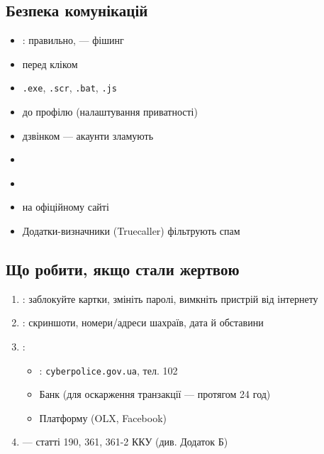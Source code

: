 \subsection*{Безпека комунікацій}

\begin{itemize}[label=--]
\item {}:  правильно,  — фішинг
\item {} перед кліком
\item {} \texttt{.exe}, \texttt{.scr}, \texttt{.bat}, \texttt{.js}
\end{itemize}

\begin{itemize}[label=--]
\item {} до профілю (налаштування приватності)
\item {} дзвінком — акаунти зламують
\item {}
\end{itemize}

\begin{itemize}[label=--]
\item {}
\item {} на офіційному сайті
\item Додатки-визначники (Truecaller) фільтрують спам
\end{itemize}

\subsection*{Що робити, якщо стали жертвою}

\begin{enumerate}[label=\arabic*)]
\item {}: заблокуйте картки, змініть паролі, вимкніть пристрій від інтернету

\item {}: скриншоти, номери/адреси шахраїв, дата й обставини

\item {}:
   \begin{itemize}[label=--]
   \item {}: \texttt{cyberpolice.gov.ua}, тел. 102
   \item Банк (для оскарження транзакції — протягом 24 год)
   \item Платформу (OLX, Facebook)
   \end{itemize}

\item {} — статті 190, 361, 361-2 ККУ (див. Додаток Б)

\end{enumerate}

